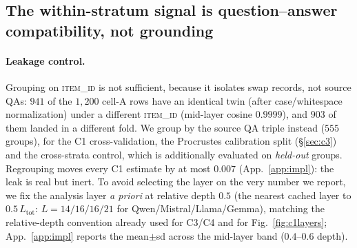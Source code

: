 \subsection{The within-stratum signal is question--answer compatibility, not grounding}
\label{sec:c1}
\paragraph{Leakage control.}
Grouping on \textsc{item\_id} is not sufficient, because it isolates swap records, not
source QAs: $941$ of the $1{,}200$ cell-A rows have an identical twin (after case/whitespace
normalization) under a different
\textsc{item\_id} (mid-layer cosine $0.9999$), and $903$ of them landed in a different
fold. We group by the source QA triple instead
($555$ groups), for the C1 cross-validation, the Procrustes calibration split
(\S\ref{sec:c3}) and the cross-strata control, which is additionally evaluated on
\emph{held-out} groups. Regrouping moves every C1 estimate by at most $0.007$
(App.~\ref{app:impl}): the leak is real but inert. To avoid selecting the
layer on the very number we report, we fix the analysis layer \emph{a priori} at
relative depth $0.5$ (the nearest cached layer to $0.5\,L_{\mathrm{tot}}$:
$L{=}14/16/16/21$ for Qwen/Mistral/Llama/Gemma), matching the relative-depth
convention already used for C3/C4 and for Fig.~\ref{fig:c1layers}; App.~\ref{app:impl}
reports the mean$\pm$sd across the mid-layer band ($0.4$--$0.6$ depth).

